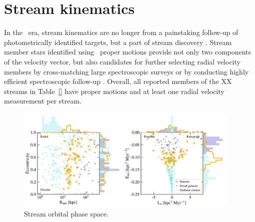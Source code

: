 \documentclass[final,5p,times,twocolumn,authoryear]{elsarticle}
\begin{document}
\section{Stream kinematics}
\label{sec:orbits}
In the \gaia\ era, stream kinematics are no longer from a painstaking follow-up of photometrically identified targets, but a part of stream discovery \citep[e.g.,][]{malhan:2018b, malhan:2019, ibata:2018, ibata:2019, ibata:2021, grillmair:2019, grillmair:2022}.
Stream member stars identified using \gaia\ proper motions provide not only two components of the velocity vector, but also candidates for further selecting radial velocity members by cross-matching large spectroscopic surveys \citep[e.g.,][]{huang:2019, yang:2022, ibata:2023} or by conducting highly efficient spectroscopic follow-up \citep[e.g.,][]{li:2019, bonaca:2020b}.
Overall, all reported members of the XX streams in Table~\ref{} have proper motions and at least one radial velocity measurement per stream.

\begin{figure}
\begin{center}
\includegraphics[width=0.95\textwidth]{figures/orbital_phase_space.pdf}
\end{center}
\caption{%
Stream orbital phase space.
\label{fig:phase_space}
}
\end{figure}
\end{document}
